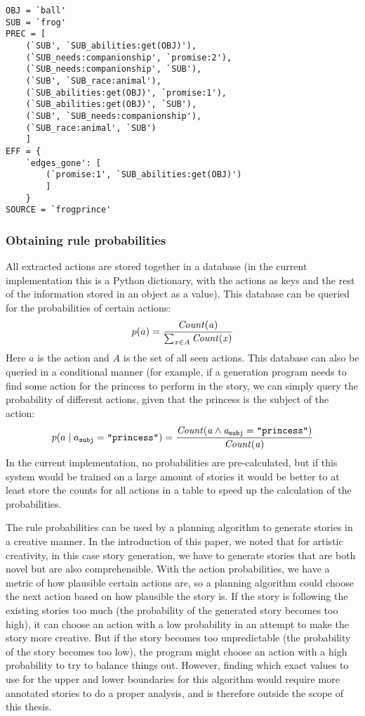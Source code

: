 \begin{verbatim}
OBJ = `ball'
SUB = `frog'
PREC = [
    (`SUB', `SUB_abilities:get(OBJ)'),
    (`SUB_needs:companionship', `promise:2'),
    (`SUB_needs:companionship', `SUB'),
    (`SUB', `SUB_race:animal'),
    (`SUB_abilities:get(OBJ)', `promise:1'),
    (`SUB_abilities:get(OBJ)', `SUB'),
    (`SUB', `SUB_needs:companionship'),
    (`SUB_race:animal', `SUB')
    ]
EFF = {
    `edges_gone': [
        (`promise:1', `SUB_abilities:get(OBJ)')
        ]
    }
SOURCE = `frogprince'

\end{verbatim}

\subsubsection{Obtaining rule probabilities}

All extracted actions are stored together in a database (in the current
implementation this is a Python dictionary, with the actions as keys and the
rest of the information stored in an object as a value). This database can be
queried for the probabilities of certain actions: 
$$p(a) = \frac{\it{Count}(a)}{\sum_{x \in A}\it{Count}(x)}$$
Here $a$ is the action and $A$ is the set of all seen actions.
This database can also be queried in a conditional manner (for
example, if a generation program needs to find some action for the princess to
perform in the story, we
can simply query the probability of different actions, given that the princess
is the subject of the action:
$$p(a \mid a_{\texttt{subj}}=\texttt{``princess''}) = 
\frac{\it{Count}(a \land a_{\texttt{subj}}=\texttt{``princess''})}{\it{Count}(a)}$$
In the current implementation, no probabilities are pre-calculated, but if this
system would be trained on a large amount of stories it would be better to
at least store the counts for all actions in a table to speed up the calculation
of the probabilities.

The rule probabilities can be used by a planning algorithm to generate stories in a
creative manner. In the introduction of this paper, we noted that for artistic
creativity, in this case story generation, we have to generate stories
that are both novel but are also comprehensible. With the action probabilities,
we have a metric of how plausible certain actions are, so a planning algorithm
could choose the next action based on how plausible the story is. If the story
is following the existing stories too much (the probability of the
generated story becomes too high), it can choose an action with a
low probability in an attempt to make the story more creative. But if the story becomes too
unpredictable (the probability of the story becomes too low), the program might
choose an action with a high probability to try to balance things out. However, finding
which exact values to use for the upper and lower boundaries for this algorithm
would require more annotated stories to do a proper analysis, and is therefore
outside the scope of this thesis.

